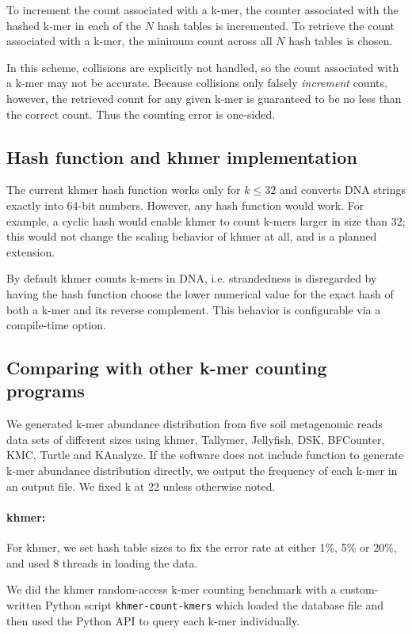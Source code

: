 \documentclass[10pt]{article}
\begin{document}
To increment the count associated with a k-mer, the counter associated
with the hashed k-mer in each of the $N$ hash tables is incremented.
To retrieve the count associated with a k-mer, the minimum count
across all $N$ hash tables is chosen.

In this scheme, collisions are explicitly not handled, so the count
associated with a k-mer may not be accurate. Because collisions only
falsely {\em increment} counts, however, the retrieved count for any
given k-mer is guaranteed to be no less than the correct count.  Thus
the counting error is one-sided.

\subsection*{Hash function and khmer implementation}

The current khmer hash function works only for $k \le 32$ and converts
DNA strings exactly into 64-bit numbers.  However, any hash function
would work. For example, a cyclic hash would enable khmer to count
k-mers larger in size than 32; this would not change the scaling
behavior of khmer at all, and is a planned extension.

By default khmer counts k-mers in DNA, i.e. strandedness is
disregarded by having the hash function choose the lower numerical
value for the exact hash of both a k-mer and its reverse complement.
This behavior is configurable via a compile-time option.

\subsection*{Comparing with other k-mer counting programs}

We generated k-mer abundance distribution from five soil metagenomic reads
data sets of different sizes using khmer, Tallymer, Jellyfish, DSK, BFCounter, 
KMC, Turtle and KAnalyze. If the software 
does not include function to generate k-mer abundance distribution directly, we output the
frequency of each k-mer in an output file.
We fixed k at 22 unless otherwise noted.

\paragraph{khmer:}
For khmer, we set hash table sizes to fix the error rate at
either 1\%, 5\% or 20\%, and used 8 threads in loading the data.

We did the khmer random-access k-mer counting benchmark with a
custom-written Python script {\tt khmer-count-kmers} which loaded the
database file and then used the Python API to query each k-mer
individually.
\end{document}
